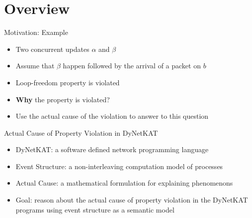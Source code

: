 \section{Overview}

\begin{frame}{Motivation: Example}
    \begin{figure}
        \centering
    \end{figure} 
    \begin{itemize}
        \item Two concurrent updates $\alpha$ and $\beta$
        \item Assume that $\beta$ happen followed by the arrival of a packet on $b$
        \item Loop-freedom property is violated
        \item \textbf{Why} the property is violated?
        \item Use the actual cause of the violation to answer to this question
    \end{itemize}
\end{frame}

\begin{frame}{Actual Cause of Property Violation in DyNetKAT}
    \begin{itemize}
        \item DyNetKAT: a software defined network programming language
        \item Event Structure: a non-interleaving computation model of processes
        \item Actual Cause: a mathematical formulation for explaining phenomenons
        \item Goal: reason about the actual cause of property violation 
        in the DyNetKAT programs using event structure as a semantic
        model
    \end{itemize}
\end{frame}


